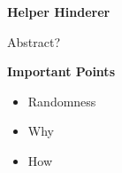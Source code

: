 \def\theTopic{Reading 3}

\begin{center}
{\bf {\large Helper Hinderer}}
\end{center}

Abstract?


 \begin{center}
   {\large\bf Important Points}
 \end{center}
 \begin{itemize}
 \item Randomness
 \item Why 
 \item How 
 \end{itemize}
